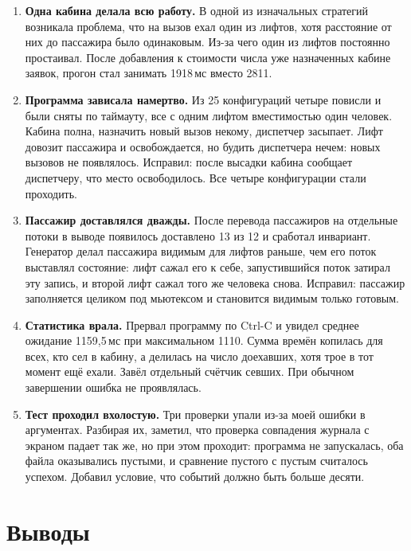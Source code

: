 \documentclass[12pt,a4paper]{article}
\begin{document}
\begin{enumerate}

\item \textbf{Одна кабина делала всю работу.} В одной из изначальных стратегий возникала проблема, что на вызов ехал один из лифтов, хотя расстояние от них до пассажира было одинаковым. Из-за чего один из лифтов постоянно простаивал. После добавления к стоимости числа уже
назначенных кабине заявок, прогон стал занимать 1918\,мс вместо 2811.

\item \textbf{Программа зависала намертво.} Из 25 конфигураций четыре
повисли и были сняты по таймауту, все с одним лифтом вместимостью один
человек. Кабина полна, назначить новый вызов некому, диспетчер засыпает.
Лифт довозит пассажира и освобождается, но будить диспетчера нечем:
новых вызовов не появлялось. Исправил: после высадки кабина сообщает
диспетчеру, что место освободилось. Все четыре конфигурации стали
проходить.

\item \textbf{Пассажир доставлялся дважды.} После перевода пассажиров на
отдельные потоки в выводе появилось доставлено 13 из 12 и сработал
инвариант. Генератор делал пассажира видимым для лифтов раньше, чем его
поток выставлял состояние: лифт сажал его к себе, запустившийся поток
затирал эту запись, и второй лифт сажал того же человека снова.
Исправил: пассажир заполняется целиком под мьютексом и становится
видимым только готовым.

\item \textbf{Статистика врала.} Прервал программу по Ctrl-C и увидел
среднее ожидание 1159,5\,мс при максимальном 1110. Сумма времён копилась
для всех, кто сел в кабину, а делилась на число доехавших, хотя трое в
тот момент ещё ехали. Завёл отдельный счётчик севших. При обычном
завершении ошибка не проявлялась.

\item \textbf{Тест проходил вхолостую.} Три проверки упали из-за моей
ошибки в аргументах. Разбирая их, заметил, что проверка совпадения
журнала с экраном падает так же, но при этом проходит: программа не
запускалась, оба файла оказывались пустыми, и сравнение пустого с пустым
считалось успехом. Добавил условие, что событий должно быть больше
десяти.

\end{enumerate}
\section{Выводы}
\end{document}
